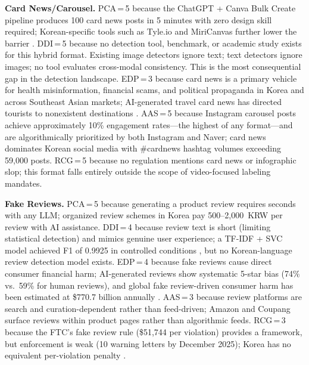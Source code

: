 \documentclass[12pt,a4paper]{article}
\begin{document}
\textbf{Card News/Carousel.} PCA\,=\,5 because the ChatGPT + Canva Bulk Create pipeline produces 100 card news posts in 5 minutes with zero design skill required; Korean-specific tools such as Tyle.io and MiriCanvas further lower the barrier \parencite{Lee2025}. DDI\,=\,5 because no detection tool, benchmark, or academic study exists for this hybrid format. Existing image detectors ignore text; text detectors ignore images; no tool evaluates cross-modal consistency. This is the most consequential gap in the detection landscape. EDP\,=\,3 because card news is a primary vehicle for health misinformation, financial scams, and political propaganda in Korea and across Southeast Asian markets; AI-generated travel card news has directed tourists to nonexistent destinations \parencite{BizHankook2025}. AAS\,=\,5 because Instagram carousel posts achieve approximately 10\% engagement rates---the highest of any format---and are algorithmically prioritized by both Instagram and Naver; card news dominates Korean social media with \#cardnews hashtag volumes exceeding 59,000 posts. RCG\,=\,5 because no regulation mentions card news or infographic slop; this format falls entirely outside the scope of video-focused labeling mandates.

\textbf{Fake Reviews.} PCA\,=\,5 because generating a product review requires seconds with any LLM; organized review schemes in Korea pay 500--2,000~KRW per review with AI assistance. DDI\,=\,4 because review text is short (limiting statistical detection) and mimics genuine user experience; a TF-IDF + SVC model achieved F1 of 0.9925 in controlled conditions \parencite{ParkLee2025}, but no Korean-language review detection model exists. EDP\,=\,4 because fake reviews cause direct consumer financial harm; AI-generated reviews show systematic 5-star bias (74\% vs.\ 59\% for human reviews), and global fake review-driven consumer harm has been estimated at \$770.7 billion annually \parencite{OriginalityAI2025b}. AAS\,=\,3 because review platforms are search and curation-dependent rather than feed-driven; Amazon and Coupang surface reviews within product pages rather than algorithmic feeds. RCG\,=\,3 because the FTC's fake review rule (\$51,744 per violation) provides a framework, but enforcement is weak (10 warning letters by December 2025); Korea has no equivalent per-violation penalty \parencite{FTC2024}.
\end{document}
